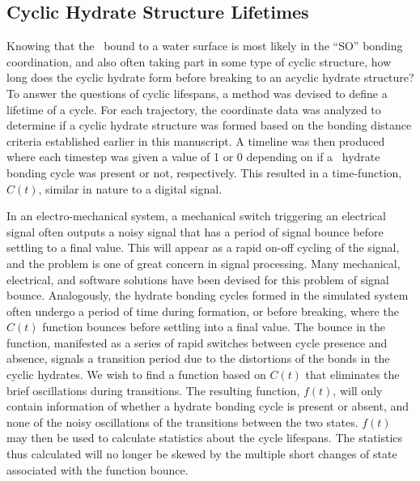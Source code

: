 \subsection {Cyclic Hydrate Structure Lifetimes}

Knowing that the \suldiox~bound to a water surface is most likely in the ``SO'' bonding coordination, and also often taking part in some type of cyclic structure, how long does the cyclic hydrate form before breaking to an acyclic hydrate structure? To answer the questions of cyclic lifespans, a method was devised to define a lifetime of a cycle. For each trajectory, the coordinate data was analyzed to determine if a cyclic hydrate structure was formed based on the bonding distance criteria established earlier in this manuscript. A timeline was then produced where each timestep was given a value of 1 or 0 depending on if a \suldiox~hydrate bonding cycle was present or not, respectively. This resulted in a time-function, $C(t)$, similar in nature to a digital signal. 

In an electro-mechanical system, a mechanical switch triggering an electrical signal often outputs a noisy signal that has a period of signal bounce before settling to a final value. This will appear as a rapid on-off cycling of the signal, and the problem is one of great concern in signal processing. Many mechanical, electrical, and software solutions have been devised for this problem of signal bounce. Analogously, the hydrate bonding cycles formed in the simulated system often undergo a period of time during formation, or before breaking, where the $C(t)$ function bounces before settling into a final value. The bounce in the function, manifested as a series of rapid switches between cycle presence and absence, signals a transition period due to the distortions of the bonds in the cyclic hydrates. We wish to find a function based on $C(t)$ that eliminates the brief oscillations during transitions. The resulting function, $f(t)$, will only contain information of whether a hydrate bonding cycle is present or absent, and none of the noisy oscillations of the transitions between the two states. $f(t)$ may then be used to calculate statistics about the cycle lifespans. The statistics thus calculated will no longer be skewed by the multiple short changes of state associated with the function bounce.

